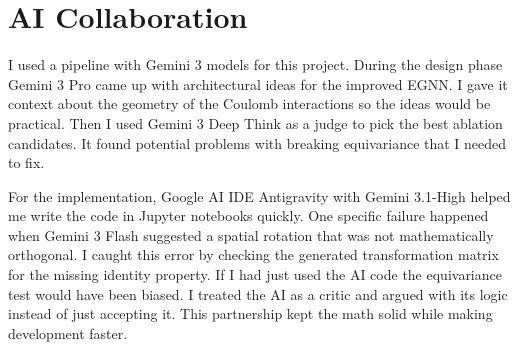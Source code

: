 \documentclass{article}
\begin{document}
\section{AI Collaboration}

I used a pipeline with Gemini 3 models for this project. During the design phase Gemini 3 Pro came up with architectural ideas for the improved EGNN. I gave it context about the geometry of the Coulomb interactions so the ideas would be practical. Then I used Gemini 3 Deep Think as a judge to pick the best ablation candidates. It found potential problems with breaking equivariance that I needed to fix.

For the implementation, Google AI IDE Antigravity with Gemini 3.1-High helped me write the code in Jupyter notebooks quickly. One specific failure happened when Gemini 3 Flash suggested a spatial rotation that was not mathematically orthogonal. I caught this error by checking the generated transformation matrix for the missing identity property. If I had just used the AI code the equivariance test would have been biased. I treated the AI as a critic and argued with its logic instead of just accepting it. This partnership kept the math solid while making development faster.
\end{document}
